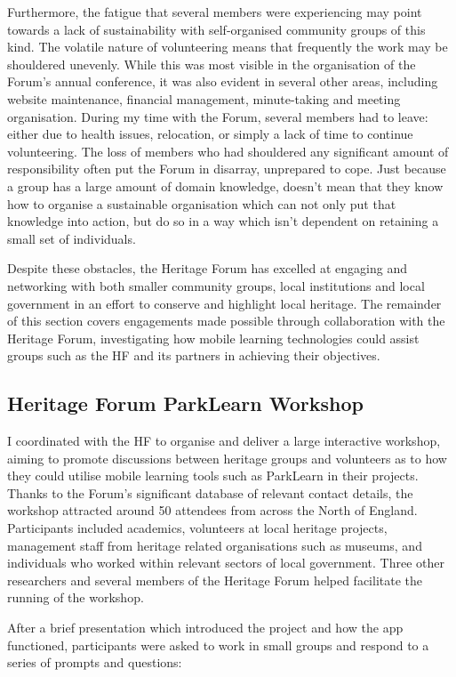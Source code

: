 Furthermore, the fatigue that several members were experiencing may point towards a lack of sustainability with self-organised community groups of this kind. The volatile nature of volunteering means that frequently the work may be shouldered unevenly. While this was most visible in the organisation of the Forum's annual conference, it was also evident in several other areas, including website maintenance, financial management, minute-taking and meeting organisation. During my time with the Forum, several members had to leave: either due to health issues, relocation, or simply a lack of time to continue volunteering. The loss of members who had shouldered any significant amount of responsibility often put the Forum in disarray, unprepared to cope. Just because a group has a large amount of domain knowledge, doesn't mean that they know how to organise a sustainable organisation which can not only put that knowledge into action, but do so in a way which isn't dependent on retaining a small set of individuals.

Despite these obstacles, the Heritage Forum has excelled at engaging and networking with both smaller community groups, local institutions and local government in an effort to conserve and highlight local heritage. The remainder of this section covers engagements made possible through collaboration with the Heritage Forum, investigating how mobile learning technologies could assist groups such as the HF and its partners in achieving their objectives.

\subsection{Heritage Forum ParkLearn Workshop}
\label{sec:HeritageParkLearnWorkshop}
I coordinated with the HF to organise and deliver a large interactive workshop, aiming to promote discussions between heritage groups and volunteers as to how they could utilise mobile learning tools such as ParkLearn in their projects. Thanks to the Forum's significant database of relevant contact details, the workshop attracted around 50 attendees from across the North of England. Participants included academics, volunteers at local heritage projects, management staff from heritage related organisations such as museums, and individuals who worked within relevant sectors of local government. Three other researchers and several members of the Heritage Forum helped facilitate the running of the workshop.

After a brief presentation which introduced the project and how the app functioned, participants were asked to work in small groups and respond to a series of prompts and questions: 

